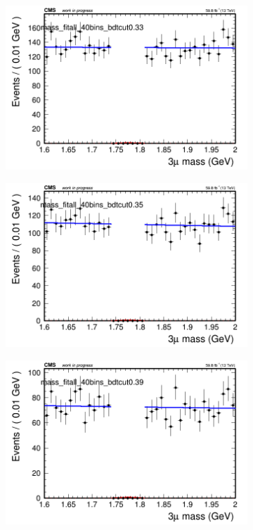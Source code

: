 \begin{figure}[H]
\begin{subfigure}{0.2\textwidth}
        \caption{}
    \end{subfigure}
    \begin{subfigure}{0.2\textwidth}
        \includegraphics[width=\textwidth]{unfixed_exp/plots/all/massfit_all_40bins_bdtcut0.33.png}
        \caption{}
    \end{subfigure}
    \begin{subfigure}{0.2\textwidth}
        \includegraphics[width=\textwidth]{unfixed_exp/plots/all/massfit_all_40bins_bdtcut0.35.png}
        \caption{}
    \end{subfigure}
    \begin{subfigure}{0.2\textwidth}
        \includegraphics[width=\textwidth]{unfixed_exp/plots/all/massfit_all_40bins_bdtcut0.39.png}

\end{subfigure}
\end{figure}

